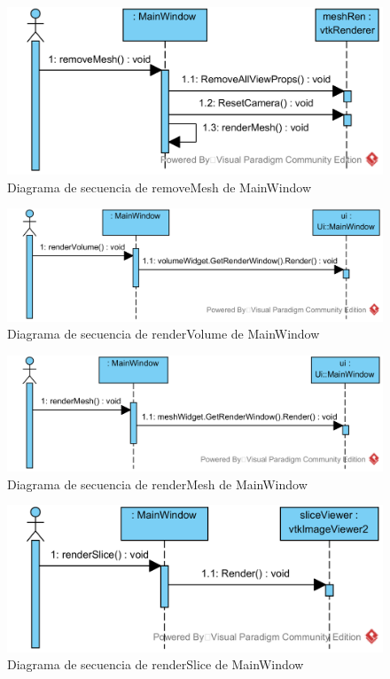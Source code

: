 \begin{figure}[H]
	\centering
	\includegraphics[width=12cm]{imagenes/diagramas/secuencia/MainWindow_RemoveMesh}
	\caption{Diagrama de secuencia de removeMesh de MainWindow}
	\label{fig:diagrama_secuencia_mainWindow_removeMesh}
\end{figure}

\begin{figure}[H]
	\centering
	\includegraphics[width=12cm]{imagenes/diagramas/secuencia/MainWindow_RenderVolume}
	\caption{Diagrama de secuencia de renderVolume de MainWindow}
	\label{fig:diagrama_secuencia_mainWindow_renderVolume}
\end{figure}

\begin{figure}[H]
	\centering
	\includegraphics[width=12cm]{imagenes/diagramas/secuencia/MainWindow_RenderMesh}
	\caption{Diagrama de secuencia de renderMesh de MainWindow}
	\label{fig:diagrama_secuencia_mainWindow_renderMesh}
\end{figure}

\begin{figure}[H]
	\centering
	\includegraphics[width=12cm]{imagenes/diagramas/secuencia/MainWindow_RenderSlice}
	\caption{Diagrama de secuencia de renderSlice de MainWindow}
	\label{fig:diagrama_secuencia_mainWindow_renderSlice}
\end{figure}

